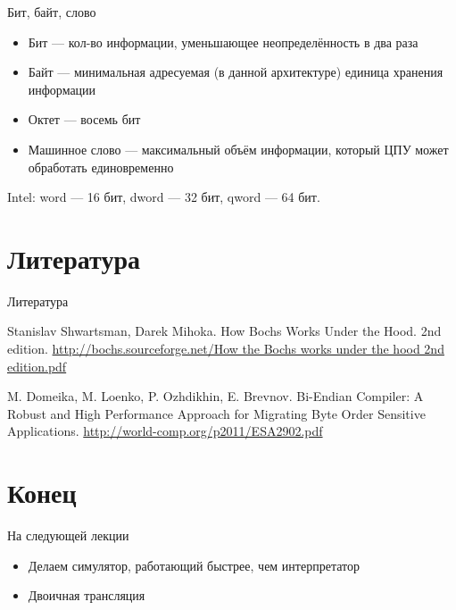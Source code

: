 \begin{frame}{Бит, байт, слово}
\begin{itemize}
\item Бит — кол-во информации, уменьшающее неопределённость в два раза\pause
\item Байт \pause — минимальная адресуемая (в данной архитектуре) единица хранения
информации \pause
\item Октет \pause — восемь бит \pause
\item Машинное слово \pause — максимальный объём информации, который ЦПУ может обработать единовременно
\end{itemize}

\pause
Intel: word — 16 бит, dword — 32 бит, qword — 64 бит.
\end{frame}



\section*{Литература}

\begin{frame}[allowframebreaks]{Литература}
\begin{thebibliography}{99}
     Stanislav Shwartsman, Darek Mihoka. How Bochs Works Under the Hood. 2nd edition.
    \url{http://bochs.sourceforge.net/How the Bochs works under the hood 2nd edition.pdf}
    
     M. Domeika, M. Loenko, P. Ozhdikhin, E. Brevnov.  Bi-Endian Compiler: A Robust and High Performance Approach for Migrating Byte Order Sensitive Applications.
    \url{http://world-comp.org/p2011/ESA2902.pdf}
\end{thebibliography}
\end{frame}

\section*{Конец}

\begin{frame}{На следующей лекции}
\begin{itemize}
\item Делаем симулятор, работающий быстрее, чем интерпретатор
\item Двоичная трансляция
\end{itemize}
\end{frame}

